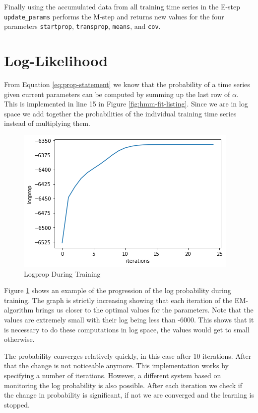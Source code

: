 Finally using the accumulated data from all training time series in the E-step \texttt{update\_params} performs the M-step and returns new values for the four parameters \texttt{startprop}, \texttt{transprop}, \texttt{means}, and \texttt{cov}.

\section{Log-Likelihood}

From Equation \eqref{eq:prop-statement} we know that the probability of a time series given current parameters can be computed by summing up the last row of $\alpha$. This is implemented in line 15 in Figure \ref{fig:hmm-fit-listing}. Since we are in log space we add together the probabilities of the individual training time series instead of multiplying them.

\begin{figure}
   \includegraphics{figures/logprop.png}
   \caption{Logprop During Training}
      
   \label{fig:lopprop-graph}
\end{figure}

Figure \ref{fig:lopprop-graph} shows an example of the progression of the log probability during training. The graph is strictly increasing showing that each iteration of the EM-algorithm brings us closer to the optimal values for the parameters. Note that the values are extremely small with their log being less than -6000. This shows that it is necessary to do these computations in log space, the values would get to small otherwise. 

The probability converges relatively quickly, in this case after 10 iterations. After that the change is not noticeable anymore. This implementation works by specifying a number of iterations. However, a different system based on monitoring the log probability is also possible. After each iteration we check if the change in probability is significant, if not we are converged and the learning is stopped.

